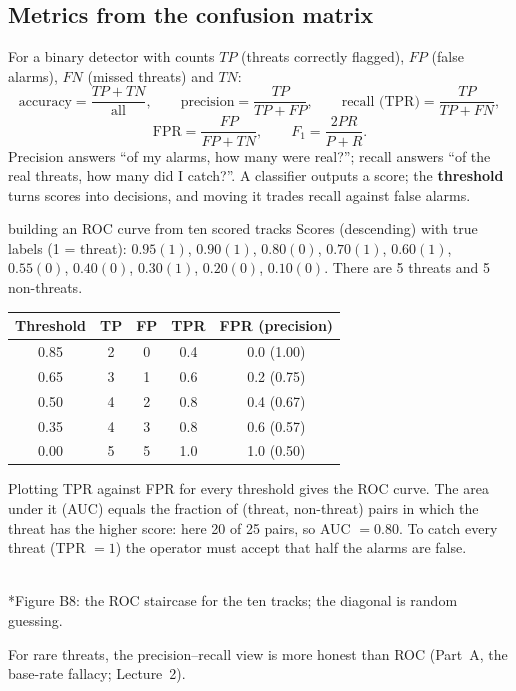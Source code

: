 \documentclass[11pt]{article}
\begin{document}
\subsection{Metrics from the confusion matrix}
For a binary detector with counts $TP$ (threats correctly flagged), $FP$ (false alarms), $FN$ (missed threats) and $TN$:
\[\text{accuracy}=\frac{TP+TN}{\text{all}},\qquad\text{precision}=\frac{TP}{TP+FP},\qquad\text{recall (TPR)}=\frac{TP}{TP+FN},\]\[\text{FPR}=\frac{FP}{FP+TN},\qquad F_1=\frac{2PR}{P+R}.\]
Precision answers ``of my alarms, how many were real?''; recall answers ``of the real threats, how many did I catch?''. A classifier outputs a score; the \textbf{threshold} turns scores into decisions, and moving it trades recall against false alarms.
\begin{example}{building an ROC curve from ten scored tracks}
Scores (descending) with true labels (1 = threat): $0.95(1)$, $0.90(1)$, $0.80(0)$, $0.70(1)$, $0.60(1)$, $0.55(0)$, $0.40(0)$, $0.30(1)$, $0.20(0)$, $0.10(0)$. There are 5 threats and 5 non-threats.
\begin{center}\small\begin{tabular}{ccccc}\toprule Threshold & TP & FP & TPR & FPR (precision)\\\midrule
0.85 & 2 & 0 & 0.4 & 0.0 \;(1.00)\\0.65 & 3 & 1 & 0.6 & 0.2 \;(0.75)\\0.50 & 4 & 2 & 0.8 & 0.4 \;(0.67)\\0.35 & 4 & 3 & 0.8 & 0.6 \;(0.57)\\0.00 & 5 & 5 & 1.0 & 1.0 \;(0.50)\\\bottomrule\end{tabular}\end{center}
Plotting TPR against FPR for every threshold gives the ROC curve. The area under it (AUC) equals the fraction of (threat, non-threat) pairs in which the threat has the higher score: here 20 of 25 pairs, so AUC $=0.80$. To catch every threat (TPR $=1$) the operator must accept that half the alarms are false.
\end{example}
\begin{center}\\*{\small\color{GreyN}Figure B8: the ROC staircase for the ten tracks; the diagonal is random guessing.}\end{center}
For rare threats, the precision--recall view is more honest than ROC (Part~A, the base-rate fallacy; Lecture~2).
\end{document}
